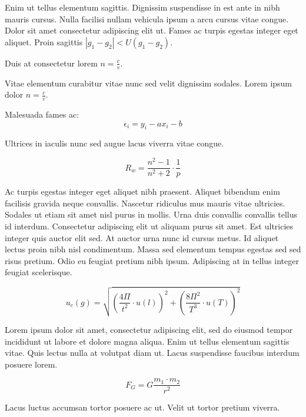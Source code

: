 \documentclass{article}
\begin{document}
Enim ut tellus elementum sagittis. Dignissim suspendisse in est ante in nibh mauris cursus. Nulla facilisi nullam vehicula ipsum a arcu cursus vitae congue. Dolor sit amet consectetur adipiscing elit ut. Fames ac turpis egestas integer eget aliquet. Proin sagittis \begin{math}
	|g_1-g_2|<U(g_1-g_2)
\end{math}.\newline

Duis at consectetur lorem $ n=\frac{c}{v} $.\newline

Vitae elementum curabitur vitae nunc sed velit dignissim sodales. Lorem ipsum dolor \( n=\frac{c}{v} \).\newline

Malesuada fames ac: \[ \epsilon_i=y_i-ax_i-b \]

Ultrices in iaculis nunc sed augue lacus viverra vitae congue.

$$ R_w=\frac{n^2-1}{n^2+2} \cdot \frac{1}{p} $$

Ac turpis egestas integer eget aliquet nibh praesent. Aliquet bibendum enim facilisis gravida neque convallis. Nascetur ridiculus mus mauris vitae ultricies. Sodales ut etiam sit amet nisl purus in mollis. Urna duis convallis convallis tellus id interdum. Consectetur adipiscing elit ut aliquam purus sit amet. Est ultricies integer quis auctor elit sed. At auctor urna nunc id cursus metus. Id aliquet lectus proin nibh nisl condimentum. Massa sed elementum tempus egestas sed sed risus pretium. Odio eu feugiat pretium nibh ipsum. Adipiscing at in tellus integer feugiat scelerisque.

\begin{displaymath}
	u_c(g)=\sqrt{(\frac{4\Pi}{t^2}\cdot u(l))^2+(\frac{8\Pi^2}{T^3}\cdot u(T))^2}
\end{displaymath}

Lorem ipsum dolor sit amet, consectetur adipiscing elit, sed do eiusmod tempor incididunt ut labore et dolore magna aliqua. Enim ut tellus elementum sagittis vitae. Quis lectus nulla at volutpat diam ut. Lacus suspendisse faucibus interdum posuere lorem. 

\begin{equation}
	F_{G}=G\frac{m_1\cdot m_2}{r^2}
\end{equation}

Lacus luctus accumsan tortor posuere ac ut. Velit ut tortor pretium viverra.
\end{document}
